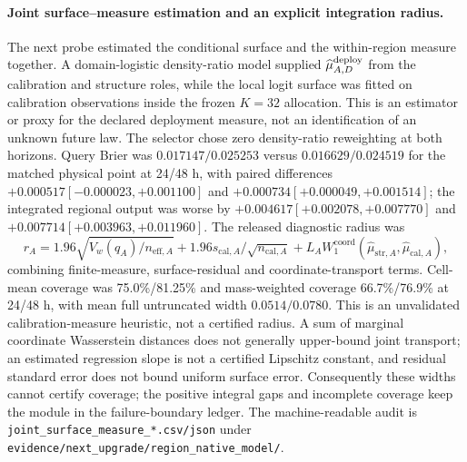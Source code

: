 \documentclass[11pt,a4paper]{article}
\numberwithin{equation}{section}
\theoremstyle{definition}\newtheorem{definition}[theorem]{Definition}
\theoremstyle{remark}\newtheorem{remark}[theorem]{Remark}
\begin{document}
\paragraph{Joint surface--measure estimation and an explicit integration radius.}
The next probe estimated the conditional surface and the within-region measure together. A domain-logistic density-ratio model supplied $\widehat\mu_{A,D}^{\rm deploy}$ from the calibration and structure roles, while the local logit surface was fitted on calibration observations inside the frozen $K=32$ allocation. This is an estimator or proxy for the declared deployment measure, not an identification of an unknown future law. The selector chose zero density-ratio reweighting at both horizons. Query Brier was $0.017147/0.025253$ versus $0.016629/0.024519$ for the matched physical point at 24/48 h, with paired differences $+0.000517[-0.000023,+0.001100]$ and $+0.000734[+0.000049,+0.001514]$; the integrated regional output was worse by $+0.004617[+0.002078,+0.007770]$ and $+0.007714[+0.003963,+0.011960]$. The released diagnostic radius was
\[
r_A=1.96\sqrt{V_w(q_A)/n_{\mathrm{eff},A}}+1.96s_{\mathrm{cal},A}/\sqrt{n_{\mathrm{cal},A}}+L_AW_1^{\mathrm{coord}}(\widehat\mu_{\mathrm{str},A},\widehat\mu_{\mathrm{cal},A}),
\]
combining finite-measure, surface-residual and coordinate-transport terms. Cell-mean coverage was 75.0\%/81.25\% and mass-weighted coverage 66.7\%/76.9\% at 24/48 h, with mean full untruncated width $0.0514/0.0780$. This is an unvalidated calibration-measure heuristic, not a certified radius. A sum of marginal coordinate Wasserstein distances does not generally upper-bound joint transport; an estimated regression slope is not a certified Lipschitz constant, and residual standard error does not bound uniform surface error. Consequently these widths cannot certify coverage; the positive integral gaps and incomplete coverage keep the module in the failure-boundary ledger. The machine-readable audit is \texttt{joint\_surface\_measure\_*.csv/json} under \texttt{evidence/next\_upgrade/region\_native\_model/}.
\end{document}
